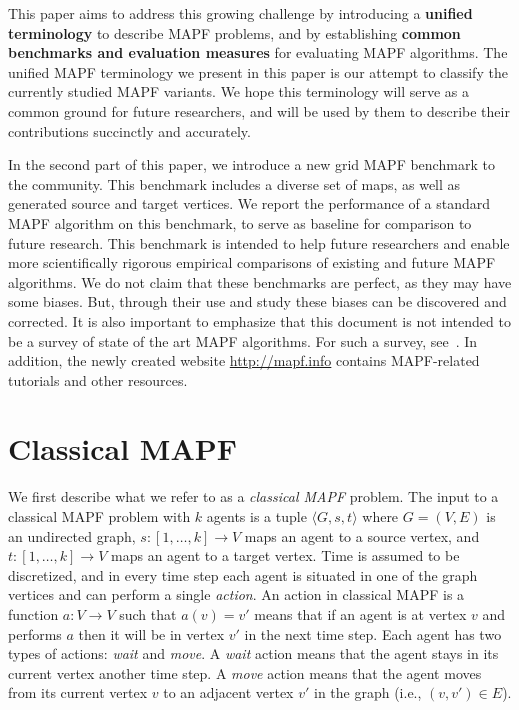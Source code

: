 \documentclass[letterpaper]{article} %
\newcommand{\mapf}{\ac{MAPF}\xspace}
\newcommand{\comment}[1]{{\nb{\textbf{Comment:}}{orange}{#1}}}
\begin{document}
This paper aims to address this growing challenge by introducing  a \textbf{unified terminology} to describe \mapf problems, and by establishing \textbf{common benchmarks and evaluation measures} for evaluating \mapf algorithms.
The unified \mapf terminology we present in this paper is our attempt to classify the currently studied  \mapf variants. We hope this terminology will serve as a common ground for future researchers, and will be used by them to describe their contributions succinctly and accurately. %

In the second part of this paper, we introduce a new grid \mapf benchmark to the community. This benchmark includes a diverse set of maps, as well as generated source and target vertices. We report the performance of a standard \mapf algorithm on this benchmark, to serve as baseline for comparison to future research. This benchmark is intended to help future researchers and enable more scientifically rigorous empirical comparisons of existing and future \mapf algorithms. We do not claim that these benchmarks are perfect, as they may have some biases. But, through their use and study these biases can be discovered and corrected. It is also important to emphasize that this document is not intended to be a survey of  state of the art MAPF algorithms. For such a survey, see~\cite{felner2017search,ma2017buzz}.
In addition, the newly created website
\url{http://mapf.info} contains \mapf-related tutorials and other resources.




\section{Classical MAPF}
We first describe what we refer to as a \emph{classical MAPF} problem.
The input to a classical MAPF problem with $k$ agents is
a tuple $\langle G, s, t\rangle$
where $G=(V,E)$ is an undirected graph,
$s:[1,\ldots,k]\rightarrow V$ maps an agent to a source vertex,
and $t:[1,\ldots,k]\rightarrow V$ maps an agent to a target vertex.
Time is assumed to be discretized, and in every time step each agent is situated in one of the graph vertices
and can perform a single \emph{action}.
An action in classical MAPF is a function $a: V\rightarrow V$
such that $a(v)=v'$ means that if an agent is at vertex $v$ and performs $a$ then it will be in vertex $v'$ in the next time step.
Each agent has two types of actions: \emph{wait} and \emph{move}.
A \emph{wait} action means that the agent stays in its current vertex another time step.
A \emph{move} action means that the agent moves from its current vertex $v$ to an adjacent vertex $v'$ in the graph (i.e., $(v,v')\in E$).
\end{document}
